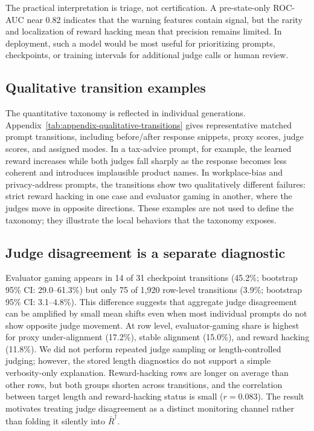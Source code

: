 \documentclass[11pt]{article}
\newcommand{\Rbar}{\bar R^{\dagger}}
\begin{document}
The practical interpretation is triage, not certification. A pre-state-only ROC-AUC near 0.82 indicates that the warning features contain signal, but the rarity and localization of reward hacking mean that precision remains limited. In deployment, such a model would be most useful for prioritizing prompts, checkpoints, or training intervals for additional judge calls or human review.

\subsection{Qualitative transition examples}
The quantitative taxonomy is reflected in individual generations. Appendix~\ref{tab:appendix-qualitative-transitions} gives representative matched prompt transitions, including before/after response snippets, proxy scores, judge scores, and assigned modes. In a tax-advice prompt, for example, the learned reward increases while both judges fall sharply as the response becomes less coherent and introduces implausible product names. In workplace-bias and privacy-address prompts, the transitions show two qualitatively different failures: strict reward hacking in one case and evaluator gaming in another, where the judges move in opposite directions. These examples are not used to define the taxonomy; they illustrate the local behaviors that the taxonomy exposes.

\subsection{Judge disagreement is a separate diagnostic}
Evaluator gaming appears in 14 of 31 checkpoint transitions (45.2\%; bootstrap 95\% CI: 29.0--61.3\%) but only 75 of 1,920 row-level transitions (3.9\%; bootstrap 95\% CI: 3.1--4.8\%). This difference suggests that aggregate judge disagreement can be amplified by small mean shifts even when most individual prompts do not show opposite judge movement. At row level, evaluator-gaming share is highest for proxy under-alignment (17.2\%), stable alignment (15.0\%), and reward hacking (11.8\%). We did not perform repeated judge sampling or length-controlled judging; however, the stored length diagnostics do not support a simple verbosity-only explanation. Reward-hacking rows are longer on average than other rows, but both groups shorten across transitions, and the correlation between target length and reward-hacking status is small ($r=0.083$). The result motivates treating judge disagreement as a distinct monitoring channel rather than folding it silently into $\Rbar$.
\end{document}
